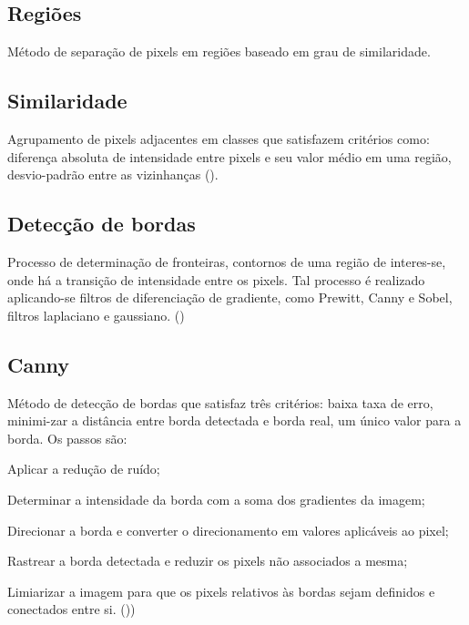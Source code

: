 \documentclass[12pt,oneside,a4paper,chapter=TITLE,section=TITLE,sumario=tradicional]{abntex2}
\begin{document}
\subsection{Regiões}
Método de separação de pixels em regiões baseado em grau de similaridade.

\subsection{Similaridade}
Agrupamento de pixels adjacentes em classes que satisfazem critérios como: diferença absoluta de intensidade entre pixels e seu valor médio em uma região, desvio-padrão entre as vizinhanças ().

\subsection{Detecção de bordas}
Processo de determinação de fronteiras, contornos de uma região de interes-se, onde há a transição de intensidade entre os pixels. Tal processo é realizado aplicando-se filtros de diferenciação de gradiente, como Prewitt, Canny e Sobel, filtros laplaciano e gaussiano. ()

\subsection{Canny}
Método de detecção de bordas que satisfaz três critérios: baixa taxa de erro, minimi-zar a distância entre borda detectada e borda real, um único valor para a borda. Os passos são:
\begin{lista}
    \item Aplicar a redução de ruído;
    \item Determinar a intensidade da borda com a soma dos gradientes da imagem;
    \item Direcionar a borda e converter o direcionamento em valores aplicáveis ao pixel;
    \item Rastrear a borda detectada e reduzir os pixels não associados a mesma;
    \item Limiarizar a imagem para que os pixels relativos às bordas sejam definidos e conectados entre si. ())
\end{lista}
\end{document}
